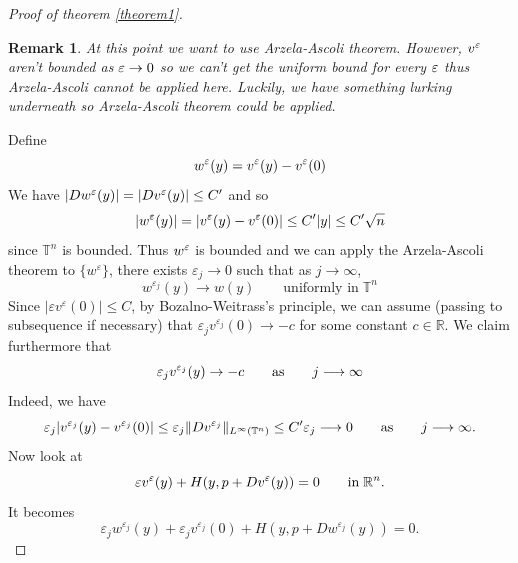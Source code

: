 \documentclass[12pt, oneside]{amsart}  	%
\newtheorem{remark}{Remark}
\begin{document}
\begin{proof}[Proof of theorem \ref{theorem1}]
\begin{remark}
At this point we want to use Arzela-Ascoli theorem. However, $v^\varepsilon$ aren't bounded as $\varepsilon\to0$ so we can't get the uniform bound for every $\varepsilon$ thus Arzela-Ascoli cannot be applied here. Luckily, we have something lurking underneath so Arzela-Ascoli theorem could be applied. 
\end{remark}

Define
		$$w^\varepsilon(y)=v^\varepsilon(y)-v^\varepsilon(0)$$
We have $|Dw^\varepsilon(y)| = |Dv^\varepsilon(y)| \le C'$ and so 
\begin{equation*}
|w^\varepsilon(y)|= |v^\varepsilon(y)-v^\varepsilon(0)|\le C'|y| \leq C'\sqrt{n}
\end{equation*}
since $\mathbb{T}^n$ is bounded. Thus $w^\varepsilon$ is bounded and we can apply the Arzela-Ascoli theorem to $\{w^\varepsilon\}$, there exists $\varepsilon_j\longrightarrow 0$ such that as $j\longrightarrow\infty$,
\begin{equation}\label{w_uniformly}
w^{\varepsilon_j}(y) \longrightarrow w(y) \qquad\text{uniformly in}\;\mathbb{T}^n
\end{equation}
Since $|\varepsilon v^\varepsilon(0)| \leq C$, by Bozalno-Weitrass's principle, we can assume (passing to subsequence if necessary) that $\varepsilon_j v^{\varepsilon_j}(0)\longrightarrow -c$ for some constant $c\in \mathbb{R}$. We claim furthermore that
\begin{equation*}
\varepsilon_j v^{\varepsilon_j}(y)\to -c\qquad\text{as}\qquad j\longrightarrow\infty
\end{equation*}
Indeed, we have
\begin{equation*}
\varepsilon_j|v^{\varepsilon_j}(y)-v^{\varepsilon_j}(0)| \leq \varepsilon_j \Vert Dv^{\varepsilon_j}\Vert_{L^\infty(\mathbb{T}^n)} \leq C'\varepsilon_j \longrightarrow 0 \qquad\text{as}\qquad j\longrightarrow \infty.
\end{equation*}
Now look at
\begin{equation*}
\varepsilon v^\varepsilon(y) + H(y, p+Dv^\varepsilon(y))=0\qquad \text{in}\; \mathbb{R}^n.
\end{equation*}
It becomes
\begin{equation}\label{my_eqn}
\varepsilon_{j}
w^{\varepsilon_{j}}\left(y\right) + 
\varepsilon_{j} v^{\varepsilon_{j}}(0) +
H(y,p+ Dw^{\varepsilon_{j}}(y)) = 0.
\end{equation}
\vspace*{0.1cm}


\end{proof}
\end{document}
